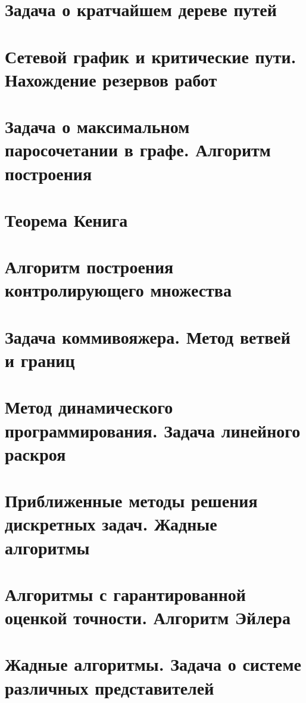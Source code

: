 \documentclass[12pt, fleqn]{article}
\begin{document}
  \section{Задача о кратчайшем дереве путей}
  
  \newpage

  \section{Сетевой график и критические пути. Нахождение резервов работ}
  \newpage

  \section{Задача о максимальном паросочетании в графе. Алгоритм построения}
  
  \newpage

  \section{Теорема Кенига}
  
  \newpage

  \section{Алгоритм построения контролирующего множества}
  \newpage

  
  \newpage

  \section{Задача коммивояжера. Метод ветвей и границ}
  \newpage

  \section{Метод динамического программирования. Задача линейного раскроя}


  \section{Приближенные методы решения дискретных задач. Жадные алгоритмы}


  \section{Алгоритмы с гарантированной оценкой точности. Алгоритм Эйлера}


  \section{Жадные алгоритмы. Задача о системе различных представителей}
\end{document}
